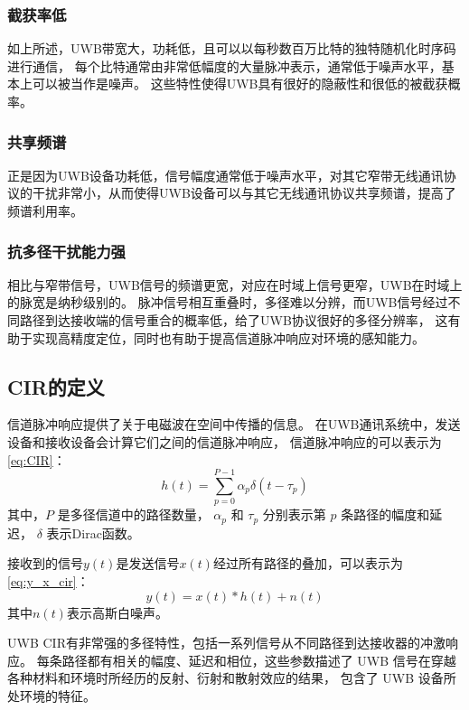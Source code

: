 \subsubsection{截获率低}
如上所述，UWB带宽大，功耗低，且可以以每秒数百万比特的独特随机化时序码进行通信，
每个比特通常由非常低幅度的大量脉冲表示，通常低于噪声水平，基本上可以被当作是噪声。
这些特性使得UWB具有很好的隐蔽性和很低的被截获概率。

\subsubsection{共享频谱}
正是因为UWB设备功耗低，信号幅度通常低于噪声水平，对其它窄带无线通讯协议的干扰非常小，从而使得UWB设备可以与其它无线通讯协议共享频谱，提高了频谱利用率。

\subsubsection{抗多径干扰能力强}
相比与窄带信号，UWB信号的频谱更宽，对应在时域上信号更窄，UWB在时域上的脉宽是纳秒级别的。
脉冲信号相互重叠时，多径难以分辨，而UWB信号经过不同路径到达接收端的信号重合的概率低，给了UWB协议很好的多径分辨率，
这有助于实现高精度定位，同时也有助于提高信道脉冲响应对环境的感知能力\cite{xhl_thesis}。

\subsection{CIR的定义}
信道脉冲响应提供了关于电磁波在空间中传播的信息。
在UWB通讯系统中，发送设备和接收设备会计算它们之间的信道脉冲响应，
信道脉冲响应的可以表示为\ref{eq:CIR}：
\begin{equation}\label{eq:CIR}
    h(t)=\sum_{p=0}^{P-1} \alpha_p \delta\left(t-\tau_p\right)
\end{equation}
其中，\( P \) 是多径信道中的路径数量，
\( \alpha_p \) 和 \( \tau_p \) 分别表示第 \( p \) 条路径的幅度和延迟，
\(\delta\) 表示Dirac函数\cite{UWB_CIR_INTRO}。

接收到的信号\(y(t)\)是发送信号\(x(t)\)经过所有路径的叠加，可以表示为\ref{eq:y_x_cir}：
\begin{equation}\label{eq:y_x_cir}
    y(t)=x(t) * h(t)+n(t)
\end{equation}
其中\( n(t) \)表示高斯白噪声\cite{tse2005fundamentals}。 

UWB CIR有非常强的多径特性，包括一系列信号从不同路径到达接收器的冲激响应。
每条路径都有相关的幅度、延迟和相位，这些参数描述了
UWB 信号在穿越各种材料和环境时所经历的反射、衍射和散射效应的结果，
包含了 UWB 设备所处环境的特征。


